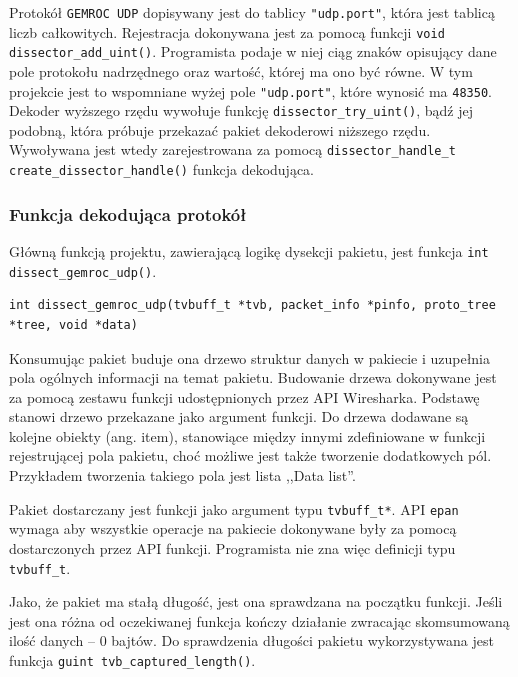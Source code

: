 \documentclass[a4paper, 12pt, twoside, openright]{article}
\begin{document}
	Protokół \texttt{GEMROC UDP} dopisywany jest do tablicy \texttt{"udp.port"}, która jest tablicą liczb całkowitych.
	Rejestracja dokonywana jest za pomocą funkcji \texttt{void dissector\_add\_uint()}. Programista podaje w niej ciąg znaków opisujący dane pole
	protokołu nadrzędnego oraz wartość, której ma ono być równe. W tym projekcie jest to wspomniane wyżej pole \texttt{"udp.port"}, które wynosić ma \texttt{48350}.
	Dekoder wyższego rzędu wywołuje funkcję \texttt{dissector\_try\_uint()}, bądź jej podobną, która próbuje przekazać pakiet
	dekoderowi niższego rzędu. Wywoływana jest wtedy zarejestrowana za pomocą \texttt{dissector\_handle\_t create\_dissector\_handle()} funkcja dekodująca.

	\subsubsection{Funkcja dekodująca protokół}
	\indent\par
	Główną funkcją projektu, zawierającą logikę dysekcji pakietu, jest funkcja \texttt{int dissect\_gemroc\_udp()}.
	\begin{lstlisting}[style=CStyleLine]
	int dissect_gemroc_udp(tvbuff_t *tvb, packet_info *pinfo, proto_tree *tree, void *data)
	\end{lstlisting}
	Konsumując pakiet buduje ona drzewo struktur danych w pakiecie i uzupełnia pola ogólnych informacji na temat pakietu. Budowanie
	drzewa dokonywane jest za pomocą zestawu funkcji udostępnionych przez API Wiresharka. Podstawę stanowi drzewo przekazane jako
	argument funkcji. Do drzewa dodawane są kolejne obiekty (ang. item), stanowiące między innymi zdefiniowane w funkcji rejestrującej
	pola pakietu, choć możliwe jest także tworzenie dodatkowych pól. Przykładem tworzenia takiego pola jest lista ,,Data list''.

	Pakiet dostarczany jest funkcji jako argument typu \texttt{tvbuff\_t*}. API \texttt{epan} wymaga aby wszystkie operacje
	na pakiecie dokonywane były za pomocą dostarczonych przez API funkcji. Programista nie zna więc definicji typu \texttt{tvbuff\_t}.

	Jako, że pakiet ma stałą długość, jest ona sprawdzana na początku funkcji. Jeśli jest ona różna od oczekiwanej funkcja
	kończy działanie zwracając skomsumowaną ilość danych -- 0 bajtów. Do sprawdzenia długości pakietu wykorzystywana jest funkcja
	\texttt{guint tvb\_captured\_length()}.
\end{document}
